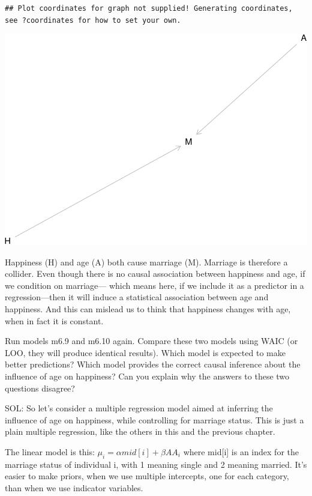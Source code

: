 \documentclass[
]{article}
\begin{document}
\begin{verbatim}
## Plot coordinates for graph not supplied! Generating coordinates, see ?coordinates for how to set your own.
\end{verbatim}

\includegraphics{INLArethinking_HW4_files/figure-latex/hw4.2 dag-1.pdf}

Happiness (H) and age (A) both cause marriage (M). Marriage is therefore
a collider. Even though there is no causal association between happiness
and age, if we condition on marriage--- which means here, if we include
it as a predictor in a regression---then it will induce a statistical
association between age and happiness. And this can mislead us to think
that happiness changes with age, when in fact it is constant.

Run models m6.9 and m6.10 again. Compare these two models using WAIC (or
LOO, they will produce identical results). Which model is expected to
make better predictions? Which model provides the correct causal
inference about the influence of age on happiness? Can you explain why
the answers to these two questions disagree?

SOL: So let's consider a multiple regression model aimed at inferring
the influence of age on happiness, while controlling for marriage
status. This is just a plain multiple regression, like the others in
this and the previous chapter.

The linear model is this: \(\mu_i= \alpha mid[i] + \beta AA_i\) where
mid{[}i{]} is an index for the marriage status of individual i, with 1
meaning single and 2 meaning married. It's easier to make priors, when
we use multiple intercepts, one for each category, than when we use
indicator variables.
\end{document}
